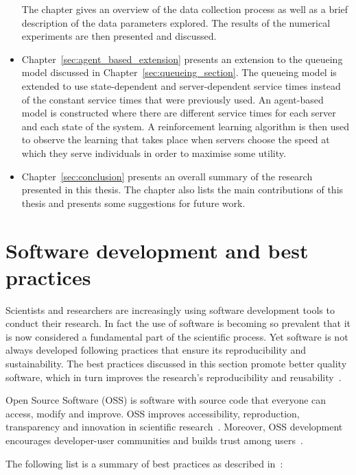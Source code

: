 \begin{itemize}
    The chapter gives an overview of the data collection process as well as a
    brief description of the data parameters explored.
    The results of the numerical experiments are then presented and discussed.
    \item Chapter~\ref{sec:agent_based_extension} presents an extension to the
    queueing model discussed in Chapter~\ref{sec:queueing_section}.
    The queueing model is extended to use state-dependent and server-dependent
    service times instead of the constant service times that were previously
    used.
    An agent-based model is constructed where there are different service
    times for each server and each state of the system.
    A reinforcement learning algorithm is then used to observe the learning
    that takes place when servers choose the speed at which they serve
    individuals in order to maximise some utility.
    \item Chapter~\ref{sec:conclusion} presents an overall summary of the
    research presented in this thesis.
    The chapter also lists the main contributions of this thesis and presents
    some suggestions for future work.
\end{itemize}




\section{Software development and best practices}\label{sec:intro_software}

Scientists and researchers are increasingly using software development tools to
conduct their research.
In fact the use of software is becoming so prevalent that it is now
considered a fundamental part of the scientific process.
Yet software is not always developed following practices that ensure its
reproducibility and sustainability.
The best practices discussed in this section promote better quality software,
which in turn improves the research's reproducibility and
reusability~\cite{jimenez2017four}.

Open Source Software (OSS) is software with source code that everyone can
access, modify and improve.
OSS improves accessibility, reproduction, transparency and innovation in
scientific research~\cite{mulgan2005wide}.
Moreover, OSS development encourages developer-user communities and builds
trust among users~\cite{mckiernan2016open}.

The following list is a summary of best practices as described
in~\cite{wilson2014best}:

